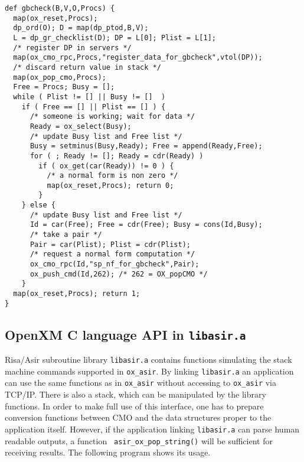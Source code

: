 \documentclass[runningheads]{cl2emult}
\begin{document}
\begin{verbatim}
def gbcheck(B,V,O,Procs) {
  map(ox_reset,Procs);
  dp_ord(O); D = map(dp_ptod,B,V);  
  L = dp_gr_checklist(D); DP = L[0]; Plist = L[1];
  /* register DP in servers */
  map(ox_cmo_rpc,Procs,"register_data_for_gbcheck",vtol(DP));
  /* discard return value in stack */
  map(ox_pop_cmo,Procs);
  Free = Procs; Busy = [];
  while ( Plist != [] || Busy != []  )
    if ( Free == [] || Plist == [] ) {
      /* someone is working; wait for data */
      Ready = ox_select(Busy);
	  /* update Busy list and Free list */
      Busy = setminus(Busy,Ready); Free = append(Ready,Free);
      for ( ; Ready != []; Ready = cdr(Ready) )
        if ( ox_get(car(Ready)) != 0 ) {
		  /* a normal form is non zero */
          map(ox_reset,Procs); return 0;
        }
    } else {
	  /* update Busy list and Free list */
      Id = car(Free); Free = cdr(Free); Busy = cons(Id,Busy);
	  /* take a pair */
	  Pair = car(Plist); Plist = cdr(Plist);
	  /* request a normal form computation */
      ox_cmo_rpc(Id,"sp_nf_for_gbcheck",Pair);
      ox_push_cmd(Id,262); /* 262 = OX_popCMO */
    }
  map(ox_reset,Procs); return 1;
}
\end{verbatim}

\subsection{OpenXM C language API in {\tt libasir.a}}

Risa/Asir subroutine library {\tt libasir.a} contains functions
simulating the stack machine commands supported in {\tt ox\_asir}.  By
linking {\tt libasir.a} an application can use the same functions as
in {\tt ox\_asir} without accessing to {\tt ox\_asir} via
TCP/IP. There is also a stack, which can be manipulated by the library
functions. In order to make full use of this interface, one has to
prepare conversion functions between CMO and the data structures
proper to the application itself. However, if the application linking
{\tt libasir.a} can parse human readable outputs, a function {\tt
asir\_ox\_pop\_string()} will be sufficient for receiving results.
The following program shows its usage.
\end{document}
